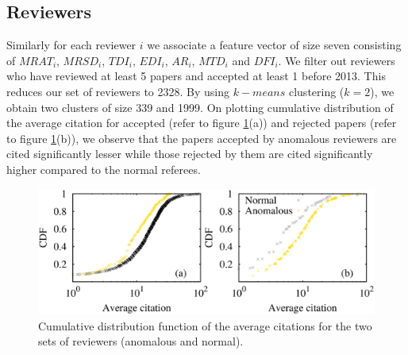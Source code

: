 \subsection{Reviewers}

Similarly for each reviewer $i$ we associate a feature vector of size seven consisting of $MRAT_{i}$, $MRSD_{i}$, $TDI_{i}$, $EDI_{i}$, $AR_{i}$, $MTD_{i}$ and $DFI_{i}$. 
We filter out reviewers who have reviewed at least 5 papers and accepted at least 1 before 2013. This reduces our set of reviewers to 2328. By using $k-means$ clustering ($k=2$), we obtain two clusters of size 339 and 
1999. On plotting cumulative distribution of the average citation for accepted (refer to figure \ref{rev_pred}(a)) and rejected papers (refer to figure \ref{rev_pred}(b)), we observe that the papers accepted by anomalous reviewers are cited significantly lesser while those rejected by them are cited significantly higher compared to the normal referees.

\begin{figure}
\centering
\includegraphics[scale=0.27]{./texfiles/Chapter_4/cikm/figures/reviewer_all_anom.eps}
\caption{\label{rev_pred}Cumulative distribution function of the average citations for the two sets of reviewers (anomalous and normal).\vspace{4mm}}
\end{figure}
\medskip